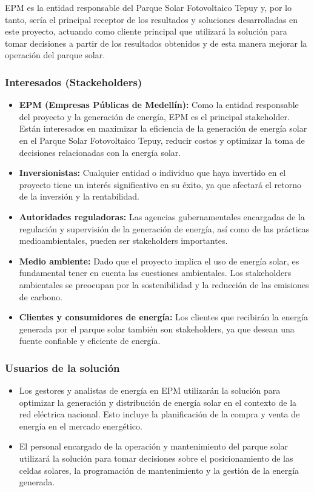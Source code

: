 \documentclass[a4paper]{article}
\begin{document}
EPM es la entidad responsable del Parque Solar Fotovoltaico Tepuy y, por lo tanto, sería el principal receptor de los resultados y soluciones desarrolladas en este proyecto, actuando como cliente principal que utilizará la solución para tomar decisiones a partir de los resultados obtenidos y de esta manera mejorar la operación del parque solar.

\subsubsection{Interesados (Stackeholders)}

\begin{itemize}
    \item \textbf{EPM (Empresas Públicas de Medellín):} Como la entidad responsable del proyecto y la generación de energía, EPM es el principal stakeholder. Están interesados en maximizar la eficiencia de la generación de energía solar en el Parque Solar Fotovoltaico Tepuy, reducir costos y optimizar la toma de decisiones relacionadas con la energía solar.
    \item \textbf{Inversionistas:} Cualquier entidad o individuo que haya invertido en el proyecto tiene un interés significativo en su éxito, ya que afectará el retorno de la inversión y la rentabilidad.
    \item \textbf{Autoridades reguladoras:} Las agencias gubernamentales encargadas de la regulación y supervisión de la generación de energía, así como de las prácticas medioambientales, pueden ser stakeholders importantes.
    \item \textbf{Medio ambiente:} Dado que el proyecto implica el uso de energía solar, es fundamental tener en cuenta las cuestiones ambientales. Los stakeholders ambientales se preocupan por la sostenibilidad y la reducción de las emisiones de carbono.
    \item \textbf{Clientes y consumidores de energía:} Los clientes que recibirán la energía generada por el parque solar también son stakeholders, ya que desean una fuente confiable y eficiente de energía.
\end{itemize}

\subsubsection{Usuarios de la solución}

\begin{itemize}
    \item Los gestores y analistas de energía en EPM utilizarán la solución para optimizar la generación y distribución de energía solar en el contexto de la red eléctrica nacional. Esto incluye la planificación de la compra y venta de energía en el mercado energético.
    \item El personal encargado de la operación y mantenimiento del parque solar utilizará la solución para tomar decisiones sobre el posicionamiento de las celdas solares, la programación de mantenimiento y la gestión de la energía generada.
    
\end{itemize}
\end{document}
